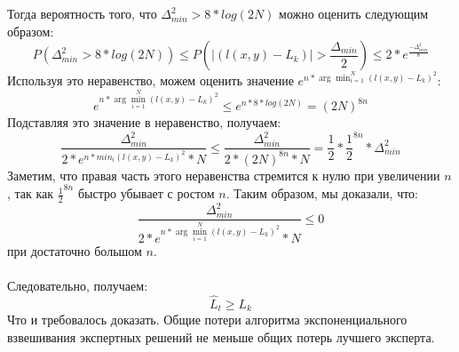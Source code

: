 \documentclass{article}
\begin{document}
Тогда вероятность того, что $\Delta_{min}^2 > 8 * log(2N)$ можно оценить следующим образом:
$$
P(\Delta_{min}^2 > 8 * log(2N)) \leq P(|(l(x,y)-L_k)| > \frac{\Delta_{min}}{2}) \leq 2 * e^{\frac{-\Delta_{min}^2}{8}}
$$
Используя это неравенство, можем оценить значение $e^{n * \arg\min_{i=1}^N (l(x,y)-L_k)^2}$:
$$
e^{n * \arg\min_{i=1}^N (l(x,y)-L_k)^2} \leq e^{n * 8 * log(2N)} = (2N)^{8n}
$$
Подставляя это значение в неравенство, получаем:
$$
\frac{\Delta_{min}^2}{2 * e^{n * min_i (l(x,y)-L_k)^2} * N} \leq \frac{\Delta_{min}^2}{2 * (2N)^{8n} * N}
= \frac{1}{2} * \frac{1}{2}^{8n} * \Delta_{min}^2
$$
Заметим, что правая часть этого неравенства стремится к нулю при увеличении $n$, так как $\frac{1}{2}^{8n}$ быстро убывает с ростом $n$. Таким образом, мы доказали, что:
$$
\frac{\Delta_{min}^2}{2 * e^{n * \arg\min_{i=1}^N (l(x,y)-L_k)^2} * N} \leq 0
$$
при достаточно большом $n$.\\\\
Следовательно, получаем:
$$
\hat{L}_t \geq L_k
$$
Что и требовалось доказать. Общие потери алгоритма экспоненциального взвешивания экспертных решений не меньше общих потерь лучшего эксперта.
\end{document}
